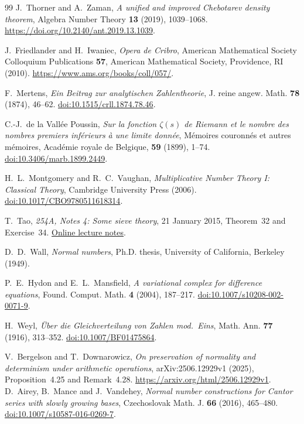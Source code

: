 \documentclass[11pt,a4paper]{article}
\begin{document}
\begin{thebibliography}{99}
J.~Thorner and A.~Zaman, \emph{A unified and improved Chebotarev density
theorem}, Algebra Number Theory \textbf{13} (2019), 1039--1068.
\url{https://doi.org/10.2140/ant.2019.13.1039}.

J.~Friedlander and H.~Iwaniec, \emph{Opera de Cribro},
American Mathematical Society Colloquium Publications \textbf{57},
American Mathematical Society, Providence, RI (2010).
\url{https://www.ams.org/books/coll/057/}.

F.~Mertens, \emph{Ein Beitrag zur analytischen Zahlentheorie},
J. reine angew. Math. \textbf{78} (1874), 46--62.
\href{https://doi.org/10.1515/crll.1874.78.46}{doi:10.1515/crll.1874.78.46}.

C.-J.~de la Vall\'ee Poussin, \emph{Sur la fonction $\zeta(s)$ de Riemann
et le nombre des nombres premiers inf\'erieurs \`a une limite donn\'ee},
M\'emoires couronn\'es et autres m\'emoires, Acad\'emie royale de Belgique,
\textbf{59} (1899), 1--74.
\href{https://doi.org/10.3406/marb.1899.2449}{doi:10.3406/marb.1899.2449}.

H.~L.~Montgomery and R.~C.~Vaughan,
\emph{Multiplicative Number Theory I: Classical Theory},
Cambridge University Press (2006).
\href{https://doi.org/10.1017/CBO9780511618314}{doi:10.1017/CBO9780511618314}.

T.~Tao, \emph{254A, Notes 4: Some sieve theory}, 21 January 2015,
Theorem~32 and Exercise~34.
\href{https://terrytao.wordpress.com/2015/01/21/254a-notes-4-some-sieve-theory/}{Online lecture notes}.

D.~D.~Wall, \emph{Normal numbers}, Ph.D. thesis,
University of California, Berkeley (1949).

P.~E.~Hydon and E.~L.~Mansfield, \emph{A variational complex for
difference equations}, Found. Comput. Math. \textbf{4} (2004), 187--217.
\href{https://doi.org/10.1007/s10208-002-0071-9}{doi:10.1007/s10208-002-0071-9}.

H.~Weyl, \emph{\"Uber die Gleichverteilung von Zahlen mod.\ Eins},
Math. Ann. \textbf{77} (1916), 313--352.
\href{https://doi.org/10.1007/BF01475864}{doi:10.1007/BF01475864}.

V.~Bergelson and T.~Downarowicz, \emph{On preservation of normality
and determinism under arithmetic operations}, arXiv:2506.12929v1 (2025),
Proposition~4.25 and Remark~4.28.
\url{https://arxiv.org/html/2506.12929v1}.
D.~Airey, B.~Mance and J.~Vandehey, \emph{Normal number constructions
for Cantor series with slowly growing bases}, Czechoslovak Math. J.
\textbf{66} (2016), 465--480.
\href{https://doi.org/10.1007/s10587-016-0269-7}{doi:10.1007/s10587-016-0269-7}.

\end{thebibliography}
\end{document}
